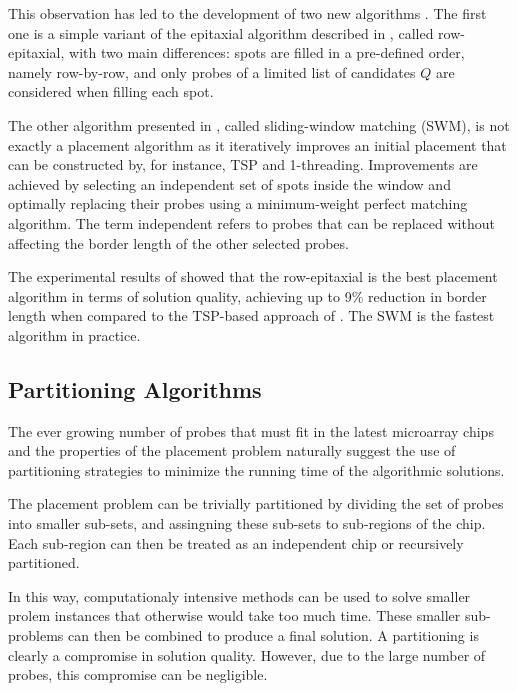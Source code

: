 \documentclass{bioinfo}
\begin{document}
This observation has led to the development of two new algorithms \citep{KAHNG03_1}. The first one is a simple variant of the epitaxial algorithm described in \citealp{KAHNG02}, called row-epitaxial, with two main differences: spots are filled in a pre-defined order, namely row-by-row, and only probes of a limited list of candidates $Q$ are considered when filling each spot.

The other algorithm presented in \citep{KAHNG03_1}, called sliding-window matching (SWM), is not exactly a placement algorithm as it iteratively improves an initial placement that can be constructed by, for instance, TSP and 1-threading. Improvements are achieved by selecting an independent set of spots inside the window and optimally replacing their probes using a minimum-weight perfect matching algorithm. The term independent refers to probes that can be replaced without affecting the border length of the other selected probes.

The experimental results of \citealp{KAHNG03_1} showed that the row-epitaxial is the best placement algorithm in terms of solution quality, achieving up to 9\% reduction in border length when compared to the TSP-based approach of \citealp{HANNENHALLI02}. The SWM is the fastest algorithm in practice.

\subsection{Partitioning Algorithms}

The ever growing number of probes that must fit in the latest microarray chips and the  properties of the placement problem naturally suggest the use of partitioning strategies to minimize the running time of the algorithmic solutions.

The placement problem can be trivially partitioned by dividing the set of probes into smaller sub-sets, and assingning these sub-sets to sub-regions of the chip. Each sub-region can then be treated as an independent chip or recursively partitioned.

In this way, computationaly intensive methods can be used to solve smaller prolem instances that otherwise would take too much time. These smaller sub-problems can then be combined to produce a final solution. A partitioning is clearly a compromise in solution quality. However, due to the large number of probes, this compromise can be negligible.
\end{document}
